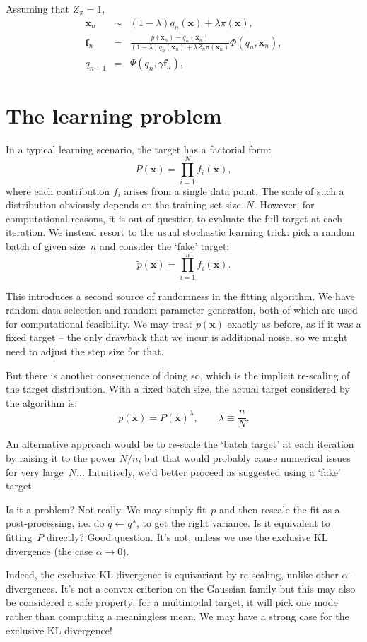 \documentclass{article}
\def\x{\mathbf{x}}
\def\f{\mathbf{f}}
\begin{document}
Assuming that $Z_\pi=1$,
\begin{eqnarray*}
\x_n & \sim & (1-\lambda) q_n(\x) + \lambda \pi(\x),\\
\f_n & = & \frac{p(\x_n) - q_n(\x_n)}{(1-\lambda)q_n(\x_n) + \lambda Z_n\pi(\x_n)} \Phi(q_n, \x_n),\\
q_{n+1} & = & \Psi(q_n, \gamma \f_n),
\end{eqnarray*}


\section{The learning problem}

In a typical learning scenario, the target has a factorial form:
$$
P(\x) = \prod_{i=1}^N f_i(\x),
$$
where each contribution $f_i$ arises from a single data point. The scale of such a distribution obviously depends on the training set size~$N$. However, for computational reasons, it is out of question to evaluate the full target at each iteration. We instead resort to the usual stochastic learning trick: pick a random batch of given size~$n$ and consider the `fake' target:
$$
\tilde{p}(\x) = \prod_{i=1}^n f_i(\x).
$$

This introduces a second source of randomness in the fitting algorithm. We have random data selection and random parameter generation, both of which are used for computational feasibility. We may treat $\tilde{p}(\x)$ exactly as before, as if it was a fixed target -- the only drawback that we incur is additional noise, so we might need to adjust the step size for that.

But there is another consequence of doing so, which is the implicit re-scaling of the target distribution. With a fixed batch size, the actual target considered by the algorithm is:
$$
p(\x) = P(\x)^\lambda,
\qquad \lambda \equiv \frac{n}{N}.
$$

An alternative approach would be to re-scale the `batch target' at each iteration by raising it to the power $N/n$, but that would probably cause numerical issues for very large~$N$... Intuitively, we'd better proceed as suggested using a `fake' target.

Is it a problem? Not really. We may simply fit~$p$ and then rescale the fit as a post-processing, i.e. do $q\leftarrow q^\lambda$, to get the right variance. Is it equivalent to fitting~$P$ directly? Good question. It's not, unless we use the exclusive KL divergence (the case $\alpha\to 0$). 

Indeed, the exclusive KL divergence is equivariant by re-scaling, unlike other $\alpha$-divergences. It's not a convex criterion on the Gaussian family but this may also be considered a safe property: for a multimodal target, it will pick one mode rather than computing a meaningless mean. We may have a strong case for the exclusive KL divergence!
\end{document}
